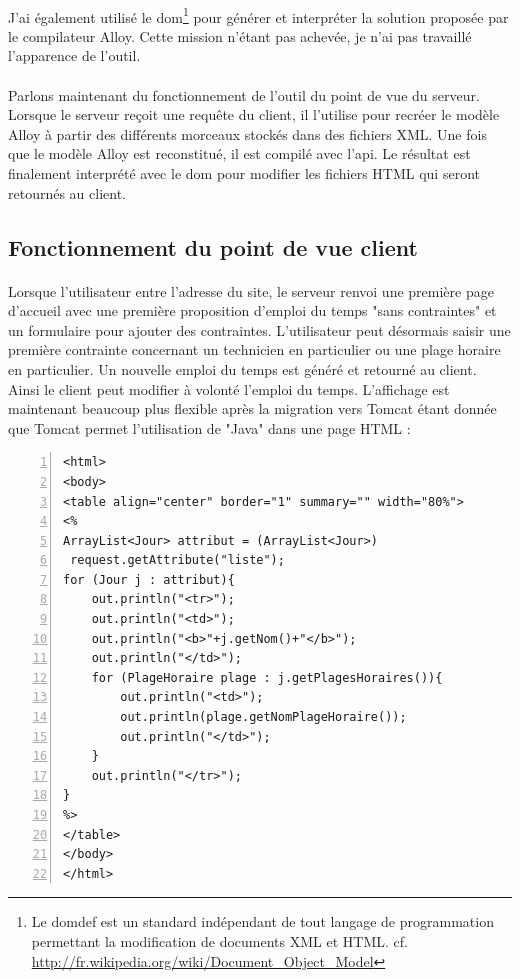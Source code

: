 \paragraph{}
J'ai également utilisé le \gls{dom}\footnote{Le \gls{domdef} est un standard indépendant de tout langage de programmation permettant la modification de documents XML et HTML. cf. \url{http://fr.wikipedia.org/wiki/Document_Object_Model}} pour générer et interpréter la solution proposée par le compilateur Alloy.
Cette mission n'étant pas achevée, je n'ai pas travaillé l'apparence de l'outil.

\paragraph{}
Parlons maintenant du fonctionnement de l'outil du point de vue du serveur.
Lorsque le serveur reçoit une requête du client, il l'utilise pour recréer le modèle Alloy à partir des différents morceaux stockés dans des fichiers XML. Une fois que le modèle Alloy est reconstitué, il est compilé avec l'\gls{api}. Le résultat est finalement interprété avec le \gls{dom} pour modifier les fichiers HTML qui seront retournés au client.



\subsection{Fonctionnement du point de vue client}%
\paragraph{}
Lorsque l'utilisateur entre l'adresse du site, le serveur renvoi une première page d'accueil avec une première proposition d'emploi du temps "sans contraintes" et un formulaire pour ajouter des contraintes. L'utilisateur peut désormais saisir une première contrainte concernant un technicien en particulier ou une plage horaire en particulier. 
Un nouvelle emploi du temps est généré et retourné au client. Ainsi le client peut modifier à volonté l'emploi du temps.
L'affichage est maintenant beaucoup plus flexible après la migration vers Tomcat étant donnée que Tomcat permet l'utilisation de "Java" dans une page HTML : 
\begin{Verbatim}[frame=single,numbers=left]
<html>
<body>
<table align="center" border="1" summary="" width="80%">
<% 
ArrayList<Jour> attribut = (ArrayList<Jour>)
 request.getAttribute("liste");
for (Jour j : attribut){
	out.println("<tr>");
	out.println("<td>");
	out.println("<b>"+j.getNom()+"</b>");
	out.println("</td>");
	for (PlageHoraire plage : j.getPlagesHoraires()){
		out.println("<td>");
		out.println(plage.getNomPlageHoraire());
		out.println("</td>");
	}
	out.println("</tr>");
}
%>
</table>
</body>
</html>
\end{Verbatim}


